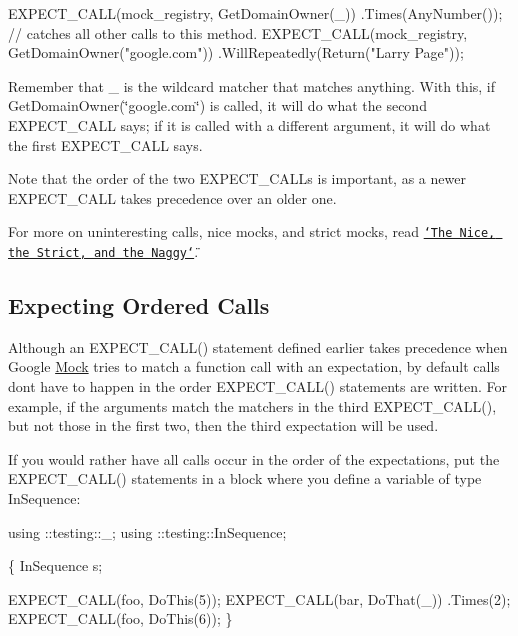 \begin{DoxyCode}
EXPECT\_CALL(mock\_registry, GetDomainOwner(\_))
      .Times(AnyNumber());  \textcolor{comment}{// catches all other calls to this method.}
EXPECT\_CALL(mock\_registry, GetDomainOwner(\textcolor{stringliteral}{"google.com"}))
      .WillRepeatedly(Return(\textcolor{stringliteral}{"Larry Page"}));
\end{DoxyCode}


Remember that {\ttfamily \+\_\+} is the wildcard matcher that matches anything. With this, if {\ttfamily Get\+Domain\+Owner(\char`\"{}google.\+com\char`\"{})} is called, it will do what the second {\ttfamily E\+X\+P\+E\+C\+T\+\_\+\+C\+A\+LL} says; if it is called with a different argument, it will do what the first {\ttfamily E\+X\+P\+E\+C\+T\+\_\+\+C\+A\+LL} says.

Note that the order of the two {\ttfamily E\+X\+P\+E\+C\+T\+\_\+\+C\+A\+L\+Ls} is important, as a newer {\ttfamily E\+X\+P\+E\+C\+T\+\_\+\+C\+A\+LL} takes precedence over an older one.

For more on uninteresting calls, nice mocks, and strict mocks, read \href{#the-nice-the-strict-and-the-naggy}{\tt \char`\"{}\+The Nice, the Strict, and the Naggy\char`\"{}}.

\subsection*{Expecting Ordered Calls}

Although an {\ttfamily E\+X\+P\+E\+C\+T\+\_\+\+C\+A\+L\+L()} statement defined earlier takes precedence when Google \hyperlink{classMock}{Mock} tries to match a function call with an expectation, by default calls don\textquotesingle{}t have to happen in the order {\ttfamily E\+X\+P\+E\+C\+T\+\_\+\+C\+A\+L\+L()} statements are written. For example, if the arguments match the matchers in the third {\ttfamily E\+X\+P\+E\+C\+T\+\_\+\+C\+A\+L\+L()}, but not those in the first two, then the third expectation will be used.

If you would rather have all calls occur in the order of the expectations, put the {\ttfamily E\+X\+P\+E\+C\+T\+\_\+\+C\+A\+L\+L()} statements in a block where you define a variable of type {\ttfamily In\+Sequence}\+:


\begin{DoxyCode}
using ::testing::\_;
using ::testing::InSequence;

\{
  InSequence s;

  EXPECT\_CALL(foo, DoThis(5));
  EXPECT\_CALL(bar, DoThat(\_))
      .Times(2);
  EXPECT\_CALL(foo, DoThis(6));
\}
\end{DoxyCode}


